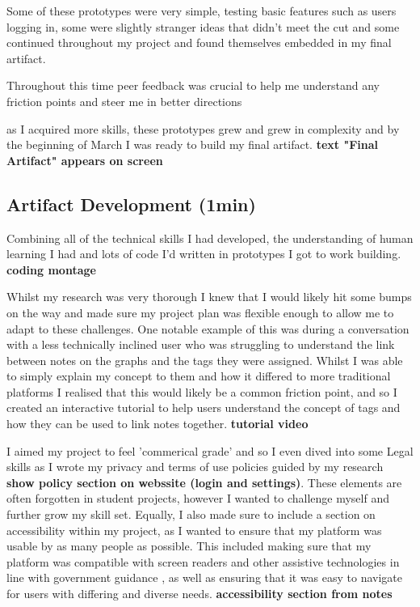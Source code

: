 Some of these prototypes were very simple, testing basic features such as users logging in, some were slightly stranger ideas that didn't meet the cut and some continued throughout my project and found themselves embedded in my final artifact.

Throughout this time peer feedback was crucial to help me understand any friction points and steer me in better directions

as I acquired more skills, these prototypes grew and grew in complexity and by the beginning of March I was ready to build my final artifact. \textbf{text "Final Artifact" appears on screen}


\subsection*{Artifact Development (1min)}
Combining all of the technical skills I had developed, the understanding of human learning I had and lots of code I'd written in prototypes I got to work building. \textbf{coding montage}


Whilst my research was very thorough I knew that I would likely hit some bumps on the way and made sure my project plan was flexible enough to allow me to adapt to these challenges. One notable example of this was during a conversation with a less technically inclined user who was struggling to understand the link between notes on the graphs and the tags they were assigned. Whilst I was able to simply explain my concept to them and how it differed to more traditional platforms I realised that this would likely be a common friction point, and so I created an interactive tutorial  to help users understand the concept of tags and how they can be used to link notes together. \textbf{tutorial video}

I aimed my project to feel 'commerical grade' and so I even dived into some Legal skills as I wrote my privacy and terms of use policies guided by my research \textbf{show policy section on webssite (login and settings)}. These elements are often forgotten in student projects, however I wanted to challenge myself and further grow my skill set. Equally, I also made sure to include a section on accessibility within my project, as I wanted to ensure that my platform was usable by as many people as possible. This included making sure that my platform was compatible with screen readers and other assistive technologies in line with government guidance , as well as ensuring that it was easy to navigate for users with differing and diverse needs. \textbf{accessibility section from notes}

